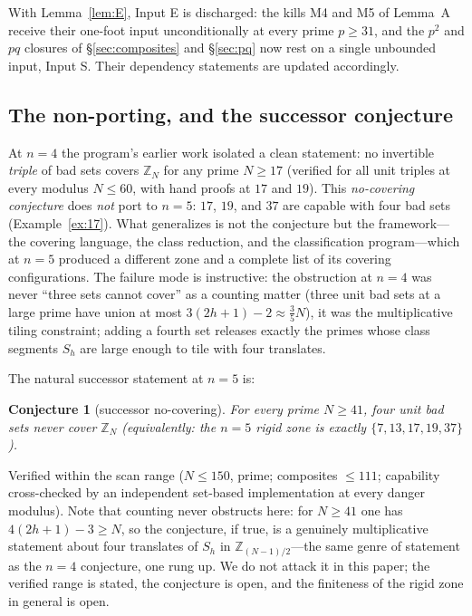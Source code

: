 \documentclass[11pt,a4paper]{article}
\numberwithin{equation}{section}
\theoremstyle{plain}
\newtheorem{conjecture}[theorem]{Conjecture}
\theoremstyle{definition}
\theoremstyle{remark}
\newcommand{\Z}{\mathbb{Z}}
\begin{document}
With Lemma~\ref{lem:E}, Input E is discharged: the kills M4 and M5 of
Lemma~A receive their one-foot input unconditionally at every prime
$p\ge31$, and the $p^2$ and $pq$ closures of \S\ref{sec:composites} and
\S\ref{sec:pq} now rest on a single unbounded input, Input S. Their
dependency statements are updated accordingly.

\subsection{The non-porting, and the successor conjecture}

At $n=4$ the program's earlier work isolated a clean statement: no
invertible \emph{triple} of bad sets covers $\Z_N$ for any prime
$N\ge 17$ (verified for all unit triples at every modulus $N\le 60$, with
hand proofs at $17$ and $19$). This \emph{no-covering conjecture} does
\emph{not} port to $n=5$: $17$, $19$, and $37$ are capable with four bad
sets (Example~\ref{ex:17}). What generalizes is not the conjecture but the
framework---the covering language, the class reduction, and the
classification program---which at $n=5$ produced a different zone and a
complete list of its covering configurations. The failure mode is
instructive: the obstruction at $n=4$ was never ``three sets cannot
cover'' as a counting matter (three unit bad sets at a large prime have
union at most $3(2h+1)-2\approx \tfrac35 N$), it was the multiplicative
tiling constraint; adding a fourth set releases exactly the primes whose
class segments $S_h$ are large enough to tile with four translates.

The natural successor statement at $n=5$ is:

\begin{conjecture}[successor no-covering]\label{conj:successor}
For every prime $N\ge 41$, four unit bad sets never cover $\Z_N$
(equivalently: the $n=5$ rigid zone is exactly $\{7,13,17,19,37\}$).
\end{conjecture}

\noindent Verified within the scan range ($N\le 150$, prime; composites
$\le 111$; capability cross-checked by an independent set-based
implementation at every danger modulus). Note that counting never
obstructs here: for $N\ge 41$ one has $4(2h+1)-3\ge N$, so the
conjecture, if true, is a genuinely multiplicative statement about four
translates of $S_h$ in $\Z_{(N-1)/2}$---the same genre of statement as
the $n=4$ conjecture, one rung up. We do not attack it in this paper; the
verified range is stated, the conjecture is open, and the finiteness of
the rigid zone in general is open.
\end{document}
